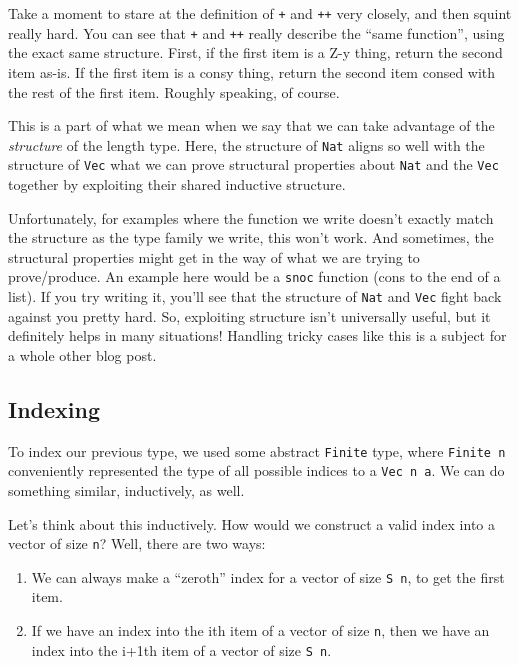 \documentclass[]{article}
\begin{document}
Take a moment to stare at the definition of \texttt{+} and \texttt{++} very
closely, and then squint really hard. You can see that \texttt{+} and
\texttt{++} really describe the ``same function'', using the exact same
structure. First, if the first item is a Z-y thing, return the second item
as-is. If the first item is a consy thing, return the second item consed with
the rest of the first item. Roughly speaking, of course.

This is a part of what we mean when we say that we can take advantage of the
\emph{structure} of the length type. Here, the structure of \texttt{Nat} aligns
so well with the structure of \texttt{Vec} what we can prove structural
properties about \texttt{Nat} and the \texttt{Vec} together by exploiting their
shared inductive structure.

Unfortunately, for examples where the function we write doesn't exactly match
the structure as the type family we write, this won't work. And sometimes, the
structural properties might get in the way of what we are trying to
prove/produce. An example here would be a \texttt{snoc} function (cons to the
end of a list). If you try writing it, you'll see that the structure of
\texttt{Nat} and \texttt{Vec} fight back against you pretty hard. So, exploiting
structure isn't universally useful, but it definitely helps in many situations!
Handling tricky cases like this is a subject for a whole other blog post.

\subsection{Indexing}\label{indexing-1}

To index our previous type, we used some abstract \texttt{Finite} type, where
\texttt{Finite\ n} conveniently represented the type of all possible indices to
a \texttt{Vec\ n\ a}. We can do something similar, inductively, as well.

Let's think about this inductively. How would we construct a valid index into a
vector of size \texttt{n}? Well, there are two ways:

\begin{enumerate}
\def\labelenumi{\arabic{enumi}.}
\tightlist
\item
  We can always make a ``zeroth'' index for a vector of size
  \texttt{\textquotesingle{}S\ n}, to get the first item.
\item
  If we have an index into the ith item of a vector of size \texttt{n}, then we
  have an index into the i+1th item of a vector of size
  \texttt{\textquotesingle{}S\ n}.
\end{enumerate}
\end{document}
